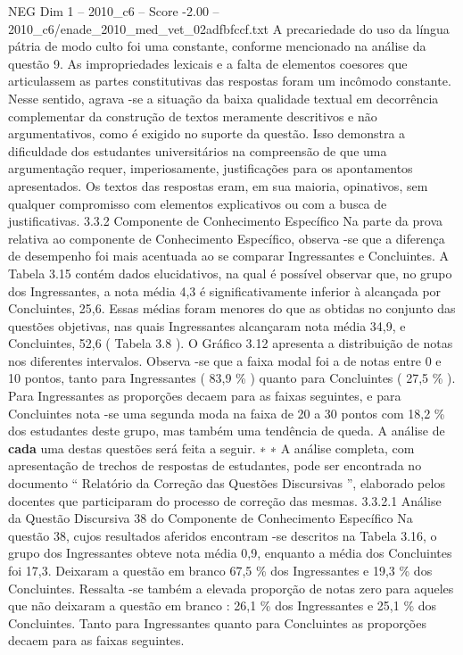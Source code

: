 \begin{textsample}{NEG Dim 1 – 2010\_c6 – Score -2.00 – 2010\_c6/enade\_2010\_med\_vet\_02adfbfccf.txt}
A precariedade do uso da língua pátria de modo culto foi uma constante, conforme mencionado na análise da questão 9.
As impropriedades lexicais e a falta de elementos coesores que articulassem as partes constitutivas das respostas foram um incômodo constante.
Nesse sentido, agrava -se a situação da baixa qualidade textual em decorrência complementar da construção de textos meramente descritivos e não argumentativos, como é exigido no suporte da questão.
Isso demonstra a dificuldade dos estudantes universitários na compreensão de que uma argumentação requer, imperiosamente, justificações para os apontamentos apresentados.
Os textos das respostas eram, em sua maioria, opinativos, sem qualquer compromisso com elementos explicativos ou com a busca de justificativas. 3.3.2 Componente de Conhecimento Específico Na parte da prova relativa ao componente de Conhecimento Específico, observa -se que a diferença de desempenho foi mais acentuada ao se comparar Ingressantes e Concluintes.
A Tabela 3.15 contém dados elucidativos, na qual é possível observar que, no grupo dos Ingressantes, a nota média 4,3 é significativamente inferior à alcançada por Concluintes, 25,6.
Essas médias foram menores do que as obtidas no conjunto das questões objetivas, nas quais Ingressantes alcançaram nota média 34,9, e Concluintes, 52,6 ( Tabela 3.8 ).
O Gráfico 3.12 apresenta a distribuição de notas nos diferentes intervalos.
Observa -se que a faixa modal foi a de notas entre 0 e 10 pontos, tanto para Ingressantes ( 83,9 \% ) quanto para Concluintes ( 27,5 \% ).
Para Ingressantes as proporções decaem para as faixas seguintes, e para Concluintes nota -se uma segunda moda na faixa de 20 a 30 pontos com 18,2 \% dos estudantes deste grupo, mas também uma tendência de queda.
A análise de \textbf{cada} uma destas questões será feita a seguir. ∗ ∗ A análise completa, com apresentação de trechos de respostas de estudantes, pode ser encontrada no documento “ Relatório da Correção das Questões Discursivas ”, elaborado pelos docentes que participaram do processo de correção das mesmas. 3.3.2.1 Análise da Questão Discursiva 38 do Componente de Conhecimento Específico Na questão 38, cujos resultados aferidos encontram -se descritos na Tabela 3.16, o grupo dos Ingressantes obteve nota média 0,9, enquanto a média dos Concluintes foi 17,3.
Deixaram a questão em branco 67,5 \% dos Ingressantes e 19,3 \% dos Concluintes.
Ressalta -se também a elevada proporção de notas zero para aqueles que não deixaram a questão em branco : 26,1 \% dos Ingressantes e 25,1 \% dos Concluintes.
Tanto para Ingressantes quanto para Concluintes as proporções decaem para as faixas seguintes.

\end{textsample}
